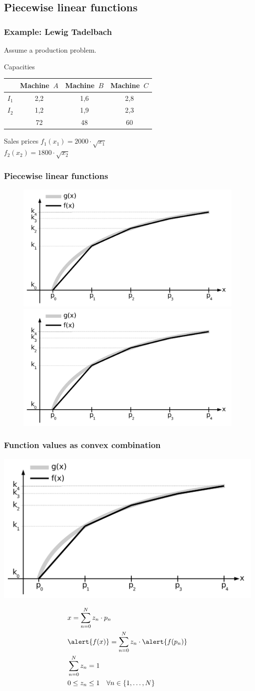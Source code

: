 \subsection{Piecewise linear functions}
\begin{frame}
 \frametitle{Example: Lewig Tadelbach}
 Assume a production problem.
 
 \begin{block}{Capacities}
	\begin{center}\upshape\small
	\begin{tabular}{lccc}
	 \toprule
	  & Machine~$A$ & Machine~$B$ & Machine~$C$ \\
	 \midrule
	 $I_1$ & 2,2 & 1,6 & 2,8\\
	 $I_2$ & 1,2 & 1,9 & 2,3\\
	 \midrule
	  & 72 & 48 & 60 \\
	 \bottomrule
	\end{tabular}
	\end{center}
  \end{block}
  
  \begin{block}{Sales prices}\centering
	$f_1(x_1) = 2000\cdot\sqrt{x_1}$\\
	$f_2(x_2) = 1800\cdot\sqrt{x_2}$ 
  \end{block}
\end{frame}

\begin{frame}
 \frametitle{Piecewise linear functions}
 \begin{figure}
  \centering
  \includegraphics<1>[width=\linewidth,page=1]{Bilder/StueckweiseLineareFunktion1}
  \includegraphics<2>[width=\linewidth,page=2]{Bilder/StueckweiseLineareFunktion1}
 \end{figure}
\end{frame}

\begin{frame}
 \frametitle{Function values as convex combination}
 \begin{flushright}
  \includegraphics[width=.5\textwidth,page=2]{Bilder/StueckweiseLineareFunktion1}
 \end{flushright}
 \vspace{-5ex}
 \begin{align*}
  &x = \sum_{n=0}^{N} z_n\cdot p_n\\
  &\alert{f(x)} = \sum_{n=0}^{N} z_n\cdot \alert{f(p_n)}\\
  &\sum_{n=0}^N z_n = 1\\
  &0 \leq z_n \leq 1\quad\forall n\in\{1, \ldots, N\}\qquad\qquad\mbox{}
 \end{align*}
\end{frame}

